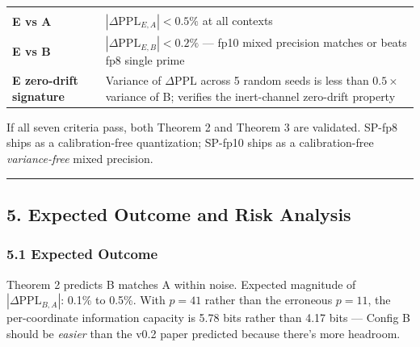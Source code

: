 \documentclass[
  11pt,
]{article}
\begin{document}
\begin{longtable}[]{@{}ll@{}}
\begin{minipage}[t]{0.47\columnwidth}
\end{minipage}\tabularnewline
\begin{minipage}[t]{0.47\columnwidth}\raggedright
\textbf{E vs A}\strut
\end{minipage} & \begin{minipage}[t]{0.47\columnwidth}\raggedright
\(|\Delta\mathrm{PPL}_{E,A}| < 0.5\%\) at all contexts\strut
\end{minipage}\tabularnewline
\begin{minipage}[t]{0.47\columnwidth}\raggedright
\textbf{E vs B}\strut
\end{minipage} & \begin{minipage}[t]{0.47\columnwidth}\raggedright
\(|\Delta\mathrm{PPL}_{E,B}| < 0.2\%\) --- fp10 mixed precision matches
or beats fp8 single prime\strut
\end{minipage}\tabularnewline
\begin{minipage}[t]{0.47\columnwidth}\raggedright
\textbf{E zero-drift signature}\strut
\end{minipage} & \begin{minipage}[t]{0.47\columnwidth}\raggedright
Variance of \(\Delta\mathrm{PPL}\) across 5 random seeds is less than
\(0.5\times\) variance of B; verifies the inert-channel zero-drift
property\strut
\end{minipage}\tabularnewline
\bottomrule
\end{longtable}

If all seven criteria pass, both Theorem 2 and Theorem 3 are validated.
SP-fp8 ships as a calibration-free quantization; SP-fp10 ships as a
calibration-free \emph{variance-free} mixed precision.

\begin{center}\rule{0.5\linewidth}{0.5pt}\end{center}

\hypertarget{expected-outcome-and-risk-analysis}{%
\subsection{5. Expected Outcome and Risk
Analysis}\label{expected-outcome-and-risk-analysis}}

\hypertarget{expected-outcome}{%
\subsubsection{5.1 Expected Outcome}\label{expected-outcome}}

Theorem 2 predicts B matches A within noise. Expected magnitude of
\(|\Delta\mathrm{PPL}_{B,A}|\): 0.1\% to 0.5\%. With \(p = 41\) rather
than the erroneous \(p = 11\), the per-coordinate information capacity
is 5.78 bits rather than 4.17 bits --- Config B should be \emph{easier}
than the v0.2 paper predicted because there's more headroom.
\end{document}
